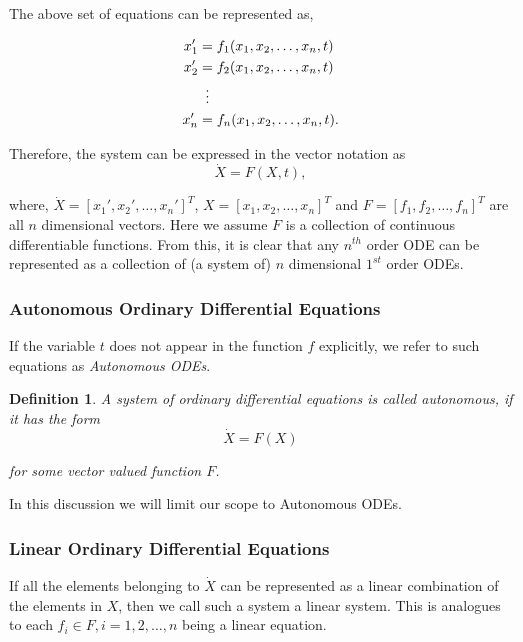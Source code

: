 \documentclass{article}
\newtheorem{definition}{Definition}
\begin{document}
The above set of equations can be represented as,

\begin{align*}
  x_1' &= f_1(x_1,x_2,\dots,x_n,t)\\
  x_2' &= f_2(x_1,x_2,\dots,x_n,t)\\
     &\mathrel{\makebox[\widthof{=}]{\vdots}} \\
  x_{n}' &= f_n(x_1,x_2,\dots,x_n,t).
\end{align*}

Therefore, the system can be expressed in the vector notation as
\begin{equation}
    \dot{X} = F(X,t),
\end{equation}

where, $\dot{X}=[x_1',x_2',\dots,x_n']^T$, $X=[x_1,x_2,\dots,x_n]^T$ and $F=[f_1,f_2,\dots,f_n]^T$ are all $n$ dimensional vectors. Here we assume $F$ is a collection of continuous differentiable functions. From this, it is clear that any $n^{th}$ order ODE can be represented as a collection of (a system of) $n$ dimensional $1^{st}$ order ODEs.

\subsubsection{Autonomous Ordinary Differential Equations}

If the variable $t$ does not appear in the function $f$ explicitly, we refer to such equations as \emph{Autonomous ODEs}.

\begin{definition}
    A system of ordinary differential equations is called autonomous, if it has the form 
    \begin{equation}\label{auto}
        \dot{X} = F(X)
    \end{equation}
    
    for some vector valued function $F$.
\end{definition}

In this discussion we will limit our scope to Autonomous ODEs. 

\subsubsection{Linear Ordinary Differential Equations}

If all the elements belonging to $\dot{X}$ can be represented as a linear combination of the elements in $X$, then we call such a system a linear system. This is analogues to each $f_i \in F,i=1,2,\dots,n$ being a linear equation. 
\end{document}
